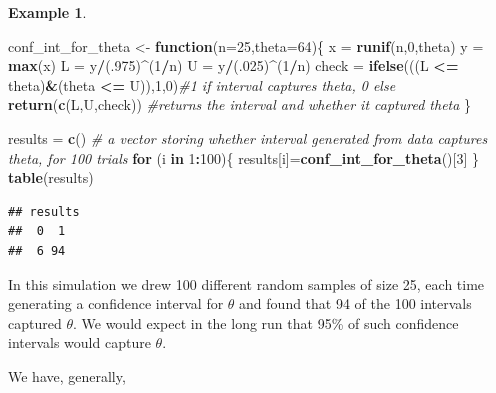 \documentclass[
]{book}
\newenvironment{Shaded}{\begin{snugshade}}{\end{snugshade}}
\newcommand{\AttributeTok}[1]{\textcolor[rgb]{0.13,0.29,0.53}{#1}}
\newcommand{\CommentTok}[1]{\textcolor[rgb]{0.56,0.35,0.01}{\textit{#1}}}
\newcommand{\ControlFlowTok}[1]{\textcolor[rgb]{0.13,0.29,0.53}{\textbf{#1}}}
\newcommand{\DecValTok}[1]{\textcolor[rgb]{0.00,0.00,0.81}{#1}}
\newcommand{\FunctionTok}[1]{\textcolor[rgb]{0.13,0.29,0.53}{\textbf{#1}}}
\newcommand{\NormalTok}[1]{#1}
\newcommand{\OtherTok}[1]{\textcolor[rgb]{0.56,0.35,0.01}{#1}}
\newcommand{\SpecialCharTok}[1]{\textcolor[rgb]{0.81,0.36,0.00}{\textbf{#1}}}
\theoremstyle{definition}
\theoremstyle{definition}
\newtheorem{example}{Example}[chapter]
\theoremstyle{definition}
\theoremstyle{definition}
\theoremstyle{remark}
\begin{document}
\begin{example}
\begin{Shaded}
\begin{Highlighting}[]
\NormalTok{conf\_int\_for\_theta }\OtherTok{\textless{}{-}} \ControlFlowTok{function}\NormalTok{(}\AttributeTok{n=}\DecValTok{25}\NormalTok{,}\AttributeTok{theta=}\DecValTok{64}\NormalTok{)\{}
\NormalTok{  x }\OtherTok{=} \FunctionTok{runif}\NormalTok{(n,}\DecValTok{0}\NormalTok{,theta)}
\NormalTok{  y }\OtherTok{=} \FunctionTok{max}\NormalTok{(x)}
\NormalTok{  L }\OtherTok{=}\NormalTok{ y}\SpecialCharTok{/}\NormalTok{(.}\DecValTok{975}\NormalTok{)}\SpecialCharTok{\^{}}\NormalTok{(}\DecValTok{1}\SpecialCharTok{/}\NormalTok{n) }
\NormalTok{  U }\OtherTok{=}\NormalTok{ y}\SpecialCharTok{/}\NormalTok{(.}\DecValTok{025}\NormalTok{)}\SpecialCharTok{\^{}}\NormalTok{(}\DecValTok{1}\SpecialCharTok{/}\NormalTok{n)}
\NormalTok{  check }\OtherTok{=} \FunctionTok{ifelse}\NormalTok{(((L }\SpecialCharTok{\textless{}=}\NormalTok{ theta)}\SpecialCharTok{\&}\NormalTok{(theta }\SpecialCharTok{\textless{}=}\NormalTok{ U)),}\DecValTok{1}\NormalTok{,}\DecValTok{0}\NormalTok{)}\CommentTok{\#1 if interval captures theta, 0 else}
  \FunctionTok{return}\NormalTok{(}\FunctionTok{c}\NormalTok{(L,U,check)) }\CommentTok{\#returns the interval and whether it captured theta}
\NormalTok{\}}

\NormalTok{results }\OtherTok{=} \FunctionTok{c}\NormalTok{() }\CommentTok{\# a vector storing whether interval generated from data captures theta, for 100 trials}
\ControlFlowTok{for}\NormalTok{ (i }\ControlFlowTok{in} \DecValTok{1}\SpecialCharTok{:}\DecValTok{100}\NormalTok{)\{}
\NormalTok{  results[i]}\OtherTok{=}\FunctionTok{conf\_int\_for\_theta}\NormalTok{()[}\DecValTok{3}\NormalTok{]}
\NormalTok{\}}
\FunctionTok{table}\NormalTok{(results)}
\end{Highlighting}
\end{Shaded}

\begin{verbatim}
## results
##  0  1 
##  6 94
\end{verbatim}

In this simulation we drew 100 different random samples of size 25, each time generating a confidence interval for \(\theta\) and found that 94 of the 100 intervals captured \(\theta\). We would expect in the long run that 95\% of such confidence intervals would capture \(\theta\).
\end{example}

We have, generally,
\end{document}
